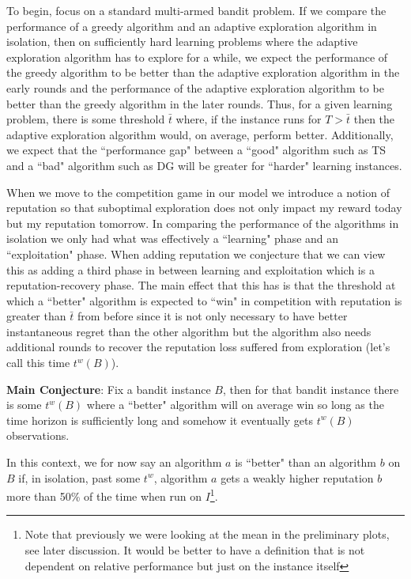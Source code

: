 \documentclass[11pt,letterpaper]{article}
\begin{document}
To begin, focus on a standard multi-armed bandit problem. If we compare the performance of a greedy algorithm and an adaptive exploration algorithm in isolation, then on sufficiently hard learning problems where the adaptive exploration algorithm has to explore for a while, we expect the performance of the greedy algorithm to be better than the adaptive exploration algorithm in the early rounds and the performance of the adaptive exploration algorithm to be better than the greedy algorithm in the later rounds. Thus, for a given learning problem, there is some threshold $\bar{t}$ where, if the instance runs for $T > \bar{t}$ then the adaptive exploration algorithm would, on average, perform better. Additionally, we expect that the ``performance gap" between a ``good" algorithm such as TS and a ``bad" algorithm such as DG will be greater for ``harder" learning instances.

When we move to the competition game in our model we introduce a notion of reputation so that suboptimal exploration does not only impact my reward today but my reputation tomorrow. In comparing the performance of the algorithms in isolation we only had what was effectively a ``learning" phase and an ``exploitation" phase. When adding reputation we conjecture that we can view this as adding a third phase in between learning and exploitation which is a reputation-recovery phase. The main effect that this has is that the threshold at which a ``better" algorithm is expected to ``win" in competition with reputation is greater than $\bar{t}$ from before since it is not only necessary to have better instantaneous regret than the other algorithm but the algorithm also needs additional rounds to recover the reputation loss suffered from exploration (let's call this time $t^{w}(B)$).

\textbf{Main Conjecture}: Fix a bandit instance $B$, then for that bandit instance there is some $t^{w}(B)$ where a ``better" algorithm will on average win so long as the time horizon is sufficiently long and somehow it eventually gets $t^{w}(B)$ observations.

In this context, we for now say an algorithm $a$ is ``better" than an algorithm $b$ on $B$ if, in isolation, past some $t^{w}$, algorithm $a$ gets a weakly higher reputation $b$ more than 50\% of the time when run on $I$\footnote{Note that previously we were looking at the mean in the preliminary plots, see later discussion. It would be better to have a definition that is not dependent on relative performance but just on the instance itself }.
\end{document}
